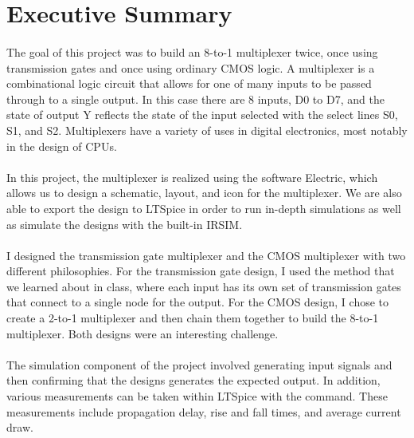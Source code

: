 \documentclass{article}
\begin{document}



\tableofcontents

\newpage
{}

\section{Executive Summary}
  \paragraph{}
  The goal of this project was to build an 8-to-1 multiplexer twice, once using transmission gates and once using ordinary CMOS logic. A multiplexer is a combinational logic circuit that allows for one of many inputs to be passed through to a single output. In this case there are 8 inputs, D0 to D7, and the state of output Y reflects the state of the input selected with the select lines S0, S1, and S2. Multiplexers have a variety of uses in digital electronics, most notably in the design of CPUs.

  \paragraph{}
  In this project, the multiplexer is realized using the software Electric, which allows us to design a schematic, layout, and icon for the multiplexer. We are also able to export the design to LTSpice in order to run in-depth simulations as well as simulate the designs with the built-in IRSIM. 

  \paragraph{}
  I designed the transmission gate multiplexer and the CMOS multiplexer with two different philosophies. For the transmission gate design, I used the method that we learned about in class, where each input has its own set of transmission gates that connect to a single node for the output. For the CMOS design, I chose to create a 2-to-1 multiplexer and then chain them together to build the 8-to-1 multiplexer. Both designs were an interesting challenge.

  \paragraph{}
  The simulation component of the project involved generating input signals and then confirming that the designs generates the expected output. In addition, various measurements can be taken within LTSpice with the  command. These measurements include propagation delay, rise and fall times, and average current draw.
\end{document}
